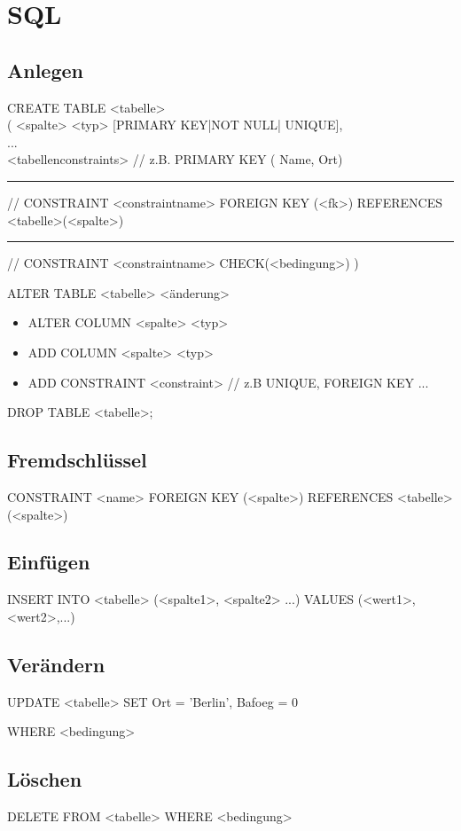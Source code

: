 \section{SQL}
\subsection{Anlegen}
CREATE TABLE <tabelle>  \\
( <spalte> <typ> [PRIMARY KEY|NOT NULL| UNIQUE],    \\
... \\
<tabellenconstraints>   // z.B. PRIMARY KEY ( Name, Ort) \\
\rule{10em}{0em}// CONSTRAINT <constraintname> FOREIGN KEY (<fk>) REFERENCES <tabelle>(<spalte>)\\

\rule{10em}{0em}// CONSTRAINT <constraintname> CHECK(<bedingung>)
)

ALTER TABLE <tabelle> <änderung>
\begin{itemize}
\item ALTER COLUMN <spalte> <typ>
\item ADD COLUMN <spalte> <typ> 
\item ADD CONSTRAINT <constraint> // z.B UNIQUE, FOREIGN KEY ...
\end{itemize}

DROP TABLE <tabelle>;

\subsection{Fremdschlüssel}
CONSTRAINT <name> FOREIGN KEY (<spalte>) REFERENCES <tabelle>(<spalte>)

\subsection{Einfügen}
INSERT INTO <tabelle> (<spalte1>, <spalte2> ...) VALUES (<wert1>, <wert2>,...)

\subsection{Verändern}
UPDATE <tabelle> SET Ort = 'Berlin', Bafoeg = 0 

WHERE <bedingung>

\subsection{Löschen}
DELETE FROM <tabelle> WHERE <bedingung>



